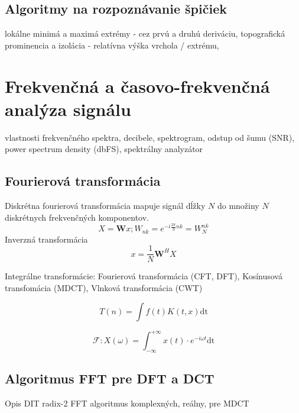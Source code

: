 \subsection{Algoritmy na rozpoznávanie špičiek}
lokálne minimá a maximá extrémy - cez prvú a druhú deriváciu,
topografická prominencia a izolácia - relatívna výška vrchola / extrému, 

\cite{survey-peaks-valleys}
\cite{peek-mountaineer-method}
\cite{ecg-r-peak-detection}
\cite{ampd-algorithm}

\section{Frekvenčná a časovo-frekvenčná analýza signálu}
vlastnosti frekvenčného spektra, decibele, spektrogram, odstup od šumu (SNR), power spectrum density (dbFS), spektrálny analyzátor 

\subsection{Fourierová transformácia}
Diskrétna fourierová transformácia mapuje signál dĺžky $N$ do množiny $N$ diskrétnych frekvenčných komponentov. \cite{signal-processing}
\begin{equation}
X = \mathbf{W}x; W_{nk} = e^{-i\frac{2\pi}{N}nk} = W_N^{nk}
\end{equation}
Inverzná transformácia
\begin{equation}
x = \frac{1}{N}\mathbf{W}^H X
\end{equation}

Integrálne transformácie: Fourierová transformácia (CFT, DFT), Kosínusová transfomácia (MDCT), Vlnková transformácia (CWT) \cite{dct} \cite{casove-frekvencia-analyza-signalu}

\begin{equation}
T(n) = \int{f(t) K(t,x) \mathrm{dt}}
\end{equation}

\begin{equation}
\mathcal{F}: X(\omega) = \int_{-\infty}^{+\infty}{x(t) \cdot e^{-i\omega t} \mathrm{dt}}
\end{equation}

\subsection{Algoritmus FFT pre DFT a DCT}
Opis DIT radix-2 FFT algoritmus komplexných, reálny, pre MDCT \cite{fft-blackbox}


